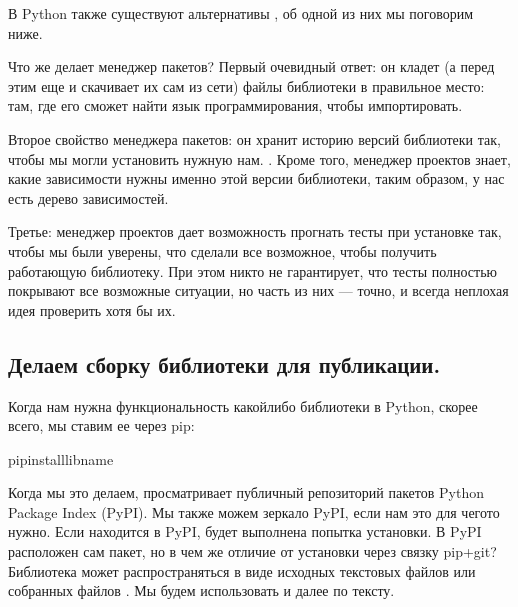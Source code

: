 \documentclass[letterpaper,10pt,russian]{sphinxmanual}
\begin{document}
\sphinxAtStartPar
В Python также существуют альтернативы , об одной из них мы поговорим ниже.

\sphinxAtStartPar
Что же делает менеджер пакетов? Первый очевидный ответ: он кладет (а перед этим еще и скачивает их сам из сети) файлы библиотеки в правильное место: там, где его сможет найти язык программирования, чтобы импортировать.

\sphinxAtStartPar
Второе свойство менеджера пакетов: он хранит историю версий библиотеки так, чтобы мы могли установить нужную нам. . Кроме того, менеджер проектов знает, какие зависимости нужны именно этой версии библиотеки, таким образом, у нас есть дерево зависимостей.

\sphinxAtStartPar
Третье: менеджер проектов дает возможность прогнать тесты при установке так, чтобы мы были уверены, что сделали все возможное, чтобы получить работающую библиотеку. При этом никто не гарантирует, что тесты полностью покрывают все возможные ситуации, но часть из них — точно, и всегда неплохая идея проверить хотя бы их.


\subsection{Делаем сборку библиотеки для публикации. }
\label{\detokenize{educational_materials/packaging/content:id2}}
\sphinxAtStartPar
Когда нам нужна функциональность какой\sphinxhyphen{}либо библиотеки в Python, скорее всего, мы ставим ее через pip:

\begin{sphinxVerbatim}[commandchars=\\\{\}]
pipinstalllib\PYGZus{}name
\end{sphinxVerbatim}

\sphinxAtStartPar
Когда мы это делаем,  просматривает публичный репозиторий пакетов Python Package Index (PyPI). Мы также можем  зеркало PyPI, если нам это для чего\sphinxhyphen{}то нужно. Если  находится в PyPI, будет выполнена попытка установки. В PyPI расположен сам пакет, но в чем же отличие от установки через связку pip+git? Библиотека может распространяться в виде исходных текстовых файлов   или собранных файлов . Мы будем использовать  и  далее по тексту.
\end{document}
